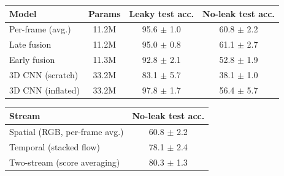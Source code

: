 \begin{tabular}{lccc}
\toprule
Model & Params & Leaky test acc. & No-leak test acc. \\
\midrule
Per-frame (avg.) & 11.2M & 95.6 $\pm$ 1.0 & 60.8 $\pm$ 2.2 \\
Late fusion & 11.2M & 95.0 $\pm$ 0.8 & 61.1 $\pm$ 2.7 \\
Early fusion & 11.3M & 92.8 $\pm$ 2.1 & 52.8 $\pm$ 1.9 \\
3D CNN (scratch) & 33.2M & 83.1 $\pm$ 5.7 & 38.1 $\pm$ 1.0 \\
3D CNN (inflated) & 33.2M & 97.8 $\pm$ 1.7 & 56.4 $\pm$ 5.7 \\
\bottomrule
\end{tabular}

\begin{tabular}{lc}
\toprule
Stream & No-leak test acc. \\
\midrule
Spatial (RGB, per-frame avg.) & 60.8 $\pm$ 2.2 \\
Temporal (stacked flow) & 78.1 $\pm$ 2.4 \\
Two-stream (score averaging) & 80.3 $\pm$ 1.3 \\
\bottomrule
\end{tabular}

